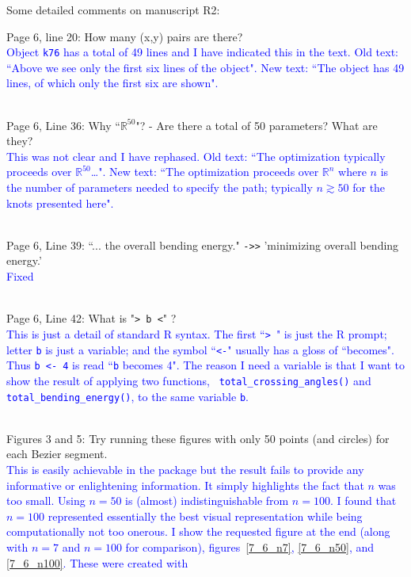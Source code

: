 \documentclass[12pt]{article}
\begin{document}
Some detailed comments on manuscript R2:

Page 6, line 20: How many (x,y) pairs are there?
\textcolor{blue}{\\Object {\tt k76} has a total of 49 lines and I have
  indicated this in the text.  Old text: ``Above we see only the first
  six lines of the object".  New text: ``The object has 49 lines, of
  which only the first six are shown".\\ \\}

Page 6, Line 36: Why ``$\mathbb{R}^{50}$"? - Are there a total of 50
parameters?  What are they?  \textcolor{blue}{\\This was not clear and
  I have rephased.  Old text: ``The optimization typically proceeds
  over $\mathbb{R}^{50}$\ldots". New text: ``The optimization
  proceeds over $\mathbb{R}^n$ where $n$ is the number of parameters
  needed to specify the path; typically $n\gtrsim 50$ for the knots
  presented here".\\ \\}

Page 6, Line 39: ``... the overall bending energy." {\tt ->>} 'minimizing
overall bending energy.'
\textcolor{blue}{\\Fixed\\ \\}

Page 6, Line 42: What is "{\tt > b <}" ?  \textcolor{blue}{\\ This is
  just a detail of standard R syntax.  The first ``{\tt > }" is just
  the R prompt; letter {\tt b} is just a variable; and the symbol
  ``{\tt <-}" usually has a gloss of ``becomes".  Thus {\tt b <- 4} is
  read ``{\tt b} becomes 4". The reason I need a variable is that I
  want to show the result of applying two functions, {\tt
    total\_crossing\_angles()} and {\tt total\_bending\_energy()}, to
  the same variable {\tt b}.\\ \\}


Figures 3 and 5: Try running these figures with only 50 points (and
circles) for each Bezier segment. \textcolor{blue}{\\This is easily
  achievable in the package but the result fails to provide any
  informative or enlightening information.  It simply highlights the
  fact that $n$ was too small.  Using $n=50$ is (almost)
  indistinguishable from $n=100$.  I found that $n=100$ represented
  essentially the best visual representation while being
  computationally not too onerous.  I show the requested figure at the
  end (along with $n=7$ and $n=100$ for comparison),
  figures~\ref{7_6_n7}, \ref{7_6_n50}, and \ref{7_6_n100}.  These were
  created with}
\end{document}
